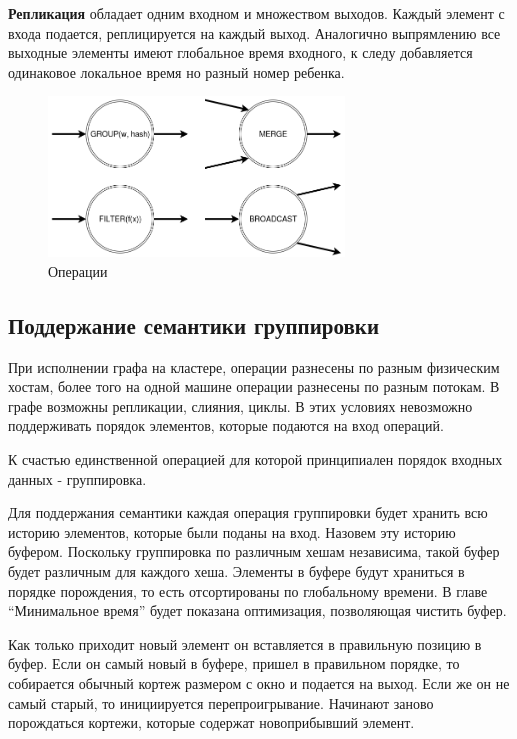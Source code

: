 \documentclass[14pt]{matmex-diploma-custom}
\begin{document}
\textbf{Репликация} обладает одним входном и множеством выходов.  Каждый элемент с входа подается, реплицируется на каждый выход. Аналогично выпрямлению все выходные элементы имеют глобальное время входного, к следу добавляется одинаковое локальное время но разный номер ребенка.

\begin{figure}
  \centering
	\includegraphics[width=0.7\textwidth]{pics/ops.png}
	\caption{Операции}
\end{figure}

\subsection{Поддержание семантики группировки}

При исполнении графа на кластере, операции разнесены по разным физическим хостам, более того на одной машине операции разнесены по разным потокам. В графе возможны репликации, слияния, циклы. В этих условиях невозможно поддерживать порядок элементов, которые подаются на вход операций.

К счастью единственной операцией для которой принципиален порядок входных данных - группировка.

Для поддержания семантики каждая операция группировки будет хранить всю историю элементов, которые были поданы на вход. Назовем эту историю буфером. Поскольку группировка по различным хешам независима, такой буфер будет различным для каждого хеша. Элементы в буфере будут храниться в порядке порождения, то есть отсортированы по глобальному времени. В главе “Минимальное время” будет показана оптимизация, позволяющая чистить буфер.

Как только приходит новый элемент он вставляется в правильную позицию в буфер. Если он самый новый в буфере, пришел в правильном порядке, то собирается обычный кортеж размером с окно и подается на выход. Если же он не самый старый, то инициируется перепроигрывание. Начинают заново порождаться кортежи, которые содержат новоприбывший элемент.
\end{document}
